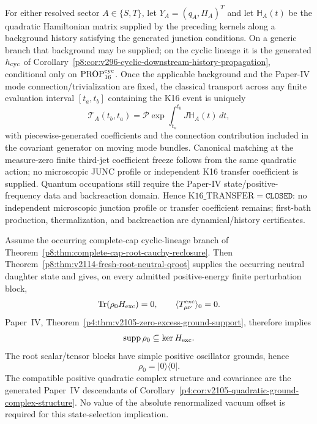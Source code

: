 \documentclass[12pt,a4paper]{article}
\begin{document}
\begin{theorem}
\label{p8:thm:v189-same-action-k16-transfer}
For either resolved sector $A\in\{S,T\}$, let $Y_A=(q_A,\Pi_A)^T$ and let
$\mathbb H_A(t)$ be the quadratic Hamiltonian matrix supplied by the preceding
kernels along a background history satisfying the generated junction
conditions.  On a generic branch that background may be supplied; on the
cyclic lineage it is the generated \(h_{\rm cyc}\) of
Corollary~\ref{p8:cor:v296-cyclic-downstream-history-propagation}, conditional
only on \(\mathrm{PROP}^{\rm cyc}_{16}\).  Once the applicable background and
the Paper-IV mode connection/trivialization are fixed, the classical transport across any
finite evaluation interval $[t_a,t_b]$ containing the K16 event is uniquely
\[
 \boxed{\mathcal T_A(t_b,t_a)=\mathcal P\exp\!\int_{t_a}^{t_b}
 J\mathbb H_A(t)\,dt,}
\]
with piecewise-generated coefficients and the connection contribution included
in the covariant generator on moving mode bundles.  Canonical matching at the measure-zero finite third-jet coefficient freeze follows from the same quadratic action; no
microscopic JUNC profile or independent K16 transfer coefficient is supplied.
Quantum occupations still require the Paper-IV state/positive-frequency data
and backreaction domain.  Hence
\(\mathrm{K16\_TRANSFER}=\texttt{CLOSED}\): no independent microscopic
junction profile or transfer coefficient remains; first-bath production,
thermalization, and backreaction are dynamical/history certificates.
\end{theorem}



\begin{corollary}
\label{p8:cor:v2105-qroot-primordial-vacuum}
Assume the occurring complete-cap cyclic-lineage branch of
Theorem~\ref{p8:thm:complete-cap-root-cauchy-reclosure}.  Then
Theorem~\ref{p8:thm:v2114-fresh-root-neutral-qroot} supplies the occurring
neutral daughter state and gives, on every admitted positive-energy finite
perturbation block,
\begin{equation}
\label{p8:eq:v2105-qroot-zero-excitation}
 \operatorname{Tr}(\rho_0 H_{\rm exc})=0,
 \qquad
 \langle T_{\mu\nu}^{\rm exc}\rangle_0=0.
\end{equation}
Paper~IV, Theorem~\ref{p4:thm:v2105-zero-excess-ground-support}, therefore
implies
\[
 \operatorname{supp}\rho_0\subseteq\ker H_{\rm exc}.
\]
The root scalar/tensor blocks have simple positive oscillator grounds, hence
\begin{equation}
\label{p8:eq:v2105-qroot-unique-vacuum}
 \boxed{\rho_0=|0\rangle\langle0|.}
\end{equation}
The compatible positive quadratic complex structure and covariance are the
generated Paper~IV descendants of
Corollary~\ref{p4:cor:v2105-quadratic-ground-complex-structure}.  No value of
the absolute renormalized vacuum offset is required for this state-selection
implication.
\end{corollary}
\end{document}
